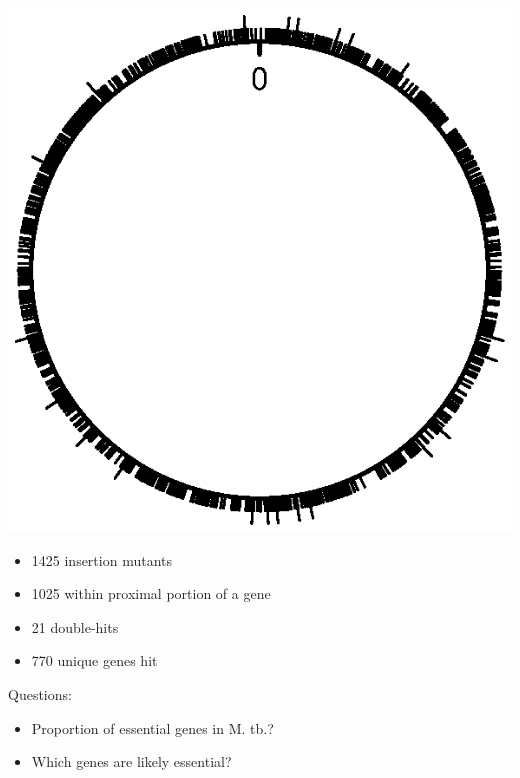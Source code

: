 \documentclass[12pt]{article}
\newcommand{\smallsize}{\fontsize{25}{30} \selectfont}
\newcommand{\headcolor}{\color [cmyk]{0.72,0.67,0.33,0}}
\newcommand{\pointcolor}{\color [named]{Bittersweet}}
\begin{document}
\begin{minipage}[t]{4in}
\vspace*{-30mm}
\centerline{\includegraphics[]{Figs/circlefig.ps}}
\end{minipage}
\hfill
\begin{minipage}[t]{5in} \begin{itemize}
\vspace*{0mm}
\setlength{\rightskip}{0pt plus 1fil} %
\setlength{\itemsep}{15pt}

\item 1425 insertion mutants

\item 1025 within proximal portion of a gene

\item 21 double-hits

\item 770 unique genes hit


\end{itemize}
\end{minipage}

\vspace{15mm}

\begin{minipage}[t]{2in}
\vspace*{0mm}
{\pointcolor Questions:}
\end{minipage}
\hfill
\begin{minipage}[t]{7.5in}
\vspace*{0mm}
\begin{itemize}
\smallsize
\setlength{\rightskip}{0pt plus 1fil} %
\setlength{\itemsep}{15pt}

\item {\headcolor Proportion of essential genes in M. tb.?}
\item {\headcolor Which genes are likely essential?}
\end{itemize}
\end{minipage}
\end{document}
